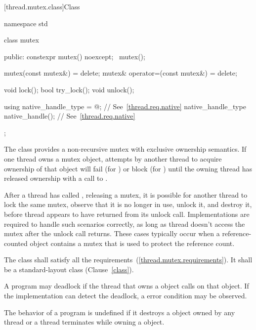 [thread.mutex.class]{Class }

\begin{codeblock}
namespace std {
  class mutex {
  public:
    constexpr mutex() noexcept;
    ~mutex();

    mutex(const mutex&) = delete;
    mutex& operator=(const mutex&) = delete;

    void lock();
    bool try_lock();
    void unlock();

    using native_handle_type = @\impdef@; // See~\ref{thread.req.native}
    native_handle_type native_handle();                // See~\ref{thread.req.native}
  };
}
\end{codeblock}

\pnum
The class  provides a non-recursive mutex with exclusive ownership
semantics. If one thread owns a mutex object, attempts by another thread to acquire
ownership of that object will fail (for ) or block (for
) until the owning thread has released ownership with a call to
.

\pnum
\begin{note}
After a thread  has called , releasing a mutex, it is possible for another
thread  to lock the same mutex, observe that it is no longer in use, unlock it, and
destroy it, before thread  appears to have returned from its unlock call. Implementations
are required to handle such scenarios correctly, as long as thread  doesn't access the
mutex after the unlock call returns. These cases typically occur when a reference-counted object
contains a mutex that is used to protect the reference count.
\end{note}

\pnum
The class  shall satisfy all the 
requirements~(\ref{thread.mutex.requirements}). It shall be a standard-layout
class (Clause~\ref{class}).

\pnum
\begin{note} A program may deadlock if the thread that owns a  object calls
 on that object. If the implementation can detect the deadlock,
a  error condition may be observed. \end{note}

\pnum
The behavior of a program is undefined if
it destroys a  object owned by any thread or
a thread terminates while owning a  object.

